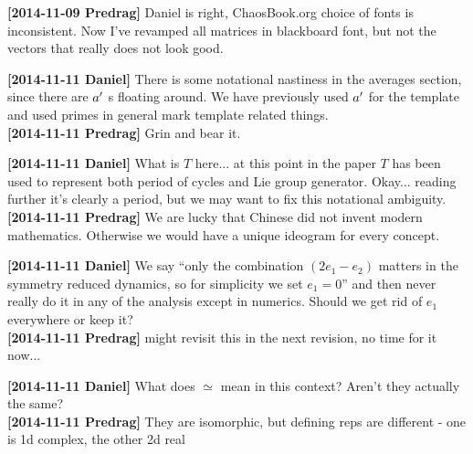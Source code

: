 {\bf[2014-11-09 Predrag]}
 Daniel is right, ChaosBook.org choice of fonts is inconsistent.
Now I've revamped all matrices in blackboard font, but not the vectors
that really does not look good.

{\bf[2014-11-11 Daniel]}
There is some notational nastiness in the averages section,
since there are $a'$ s
floating around. We have previously used $a'$ for the template and
used primes in general mark template related things.\\
{\bf[2014-11-11 Predrag]} Grin and bear it.

{\bf[2014-11-11 Daniel]}
What is $T$ here... at this point in the paper $T$ has been used to
represent both period of cycles and Lie group generator. Okay... reading
further it's clearly a period, but we may want to fix this notational
ambiguity.\\
{\bf[2014-11-11 Predrag]} We are lucky that Chinese did not invent modern
mathematics. Otherwise we would have a unique ideogram for every concept.

{\bf[2014-11-11 Daniel]}
We say ``only the combination $(2e_1-e_2)$ matters in the symmetry reduced
dynamics, so for simplicity we set $e_1=0$''
and then never really do it in any of the analysis except in numerics.
Should we get rid of $e_1$ everywhere or keep it?\\
{\bf[2014-11-11 Predrag]} might revisit this in the next revision, no time for it now...




{\bf[2014-11-11 Daniel]}
What does $\simeq$ mean in this context? Aren't they actually the same?
\\
{\bf[2014-11-11 Predrag]} They are isomorphic, but defining reps are different -
one is 1d complex, the other 2d real
